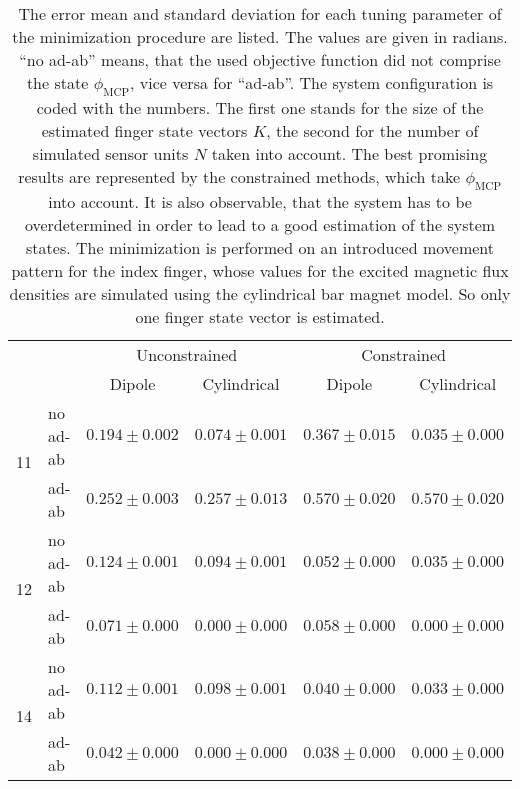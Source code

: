 \begin{table}[!htb]
\centering
\begin{tabular}{l l c c c c}
\toprule
 & &          				\multicolumn{2}{c}{Unconstrained}          &		\multicolumn{2}{c}{Constrained}\\ \cmidrule(lr){3-4}\cmidrule(lr){5-6}
 & & 								Dipole   			   & Cylindrical 	 			 & 		Dipole 			& 		Cylindrical \\ \midrule[2pt]
\multirow{2}{*}{11} & no ad-ab    & $ 0.194 \pm 0.002 $ & $ 0.074 \pm 0.001 $ & $ 0.367 \pm 0.015 $ & $ 0.035 \pm 0.000 $ \\ 
					& ad-ab		 & $ 0.252 \pm 0.003 $ & $ 0.257 \pm 0.013 $ & $ 0.570 \pm 0.020 $ & $ 0.570 \pm 0.020 $ \\ \midrule
\multirow{2}{*}{12} & no ad-ab    & $ 0.124 \pm 0.001 $ & $ 0.094 \pm 0.001 $ & $ 0.052 \pm 0.000 $ & $ 0.035 \pm 0.000 $ \\ 
					& ad-ab		 & $ 0.071 \pm 0.000 $ & $ 0.000 \pm 0.000 $ & $ 0.058 \pm 0.000 $ & $ 0.000 \pm 0.000 $\\ \midrule
\multirow{2}{*}{14} & no ad-ab    & $ 0.112 \pm 0.001 $ & $ 0.098 \pm 0.001 $ & $ 0.040 \pm 0.000 $ & $ 0.033 \pm 0.000 $ \\ 
					& ad-ab		 & $ 0.042 \pm 0.000 $ & $ 0.000 \pm 0.000 $ & $ 0.038 \pm 0.000 $ & $ 0.000 \pm 0.000 $\\										
\bottomrule
\end{tabular}
\caption[Quality of the minimization method for estimating one finger]
{The error mean and standard deviation for each tuning parameter of the minimization procedure are listed. The values are given in radians. ``no ad-ab'' means, that the used objective function did not comprise the state $ \phi_{\mathrm{MCP}} $, vice versa for ``ad-ab''. The system configuration is coded with the numbers. The first one stands for the size of the estimated finger state vectors $ K $, the second for the number of simulated sensor units $ N $ taken into account. The best promising results are represented by the constrained methods, which take $ \phi_{\mathrm{MCP}} $ into account. It is also observable, that the system has to be overdetermined in order to lead to a good estimation of the system states. The minimization is performed on an introduced movement pattern for the index finger, whose values for the excited magnetic flux densities are simulated using the cylindrical bar magnet model. So only one finger state vector is estimated.}
\label{tab:oneFing}
\end{table}



